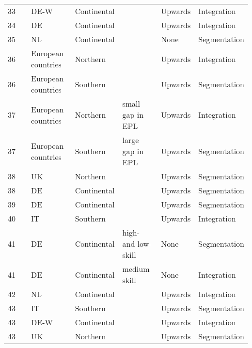 \begin{longtable}{l>{\raggedright\arraybackslash}p{1.2in}>{\raggedright\arraybackslash}p{.9in}>{\raggedright\arraybackslash}p{.9in}>{\raggedright\arraybackslash}p{1.2in}ll}
   33 & \citealp{mcginnity_etal_2005} & DE-W & Continental &  & Upwards & Integration \\ 
   34 & \citealp{mertens_mcginnity_2002} & DE & Continental &  & Upwards & Integration \\ 
   35 & \citealp{mooi-reci_dekker_2015} & NL & Continental &  & None & Segmentation \\ 
   36 & \citealp{muffels_luijkx_2008} & 14 European countries & Northern &  & Upwards & Integration \\ 
   36 & \citealp{muffels_luijkx_2008} & 14 European countries & Southern &  & Upwards & Segmentation \\ 
   37 & \citealp{passaretta_wolbers_2019} & 17 European countries & Northern & small gap in EPL & Upwards & Integration \\ 
   37 & \citealp{passaretta_wolbers_2019} & 17 European countries & Southern & large gap in EPL & Upwards & Segmentation \\ 
   38 & \citealp{pavlopoulos_2013} & UK & Northern &  & Upwards & Segmentation \\ 
   38 & \citealp{pavlopoulos_2013} & DE & Continental &  & Upwards & Segmentation \\ 
   39 & \citealp{pfeifer_2012} & DE & Continental &  & Upwards & Segmentation \\ 
   40 & \citealp{picchio_2008} & IT & Southern &  & Upwards & Integration \\ 
   41 & \citealp{reichelt_2015} & DE & Continental & high- and low-skill & None & Segmentation \\ 
   41 & \citealp{reichelt_2015} & DE & Continental & medium skill & None & Integration \\ 
   42 & \citealp{remery_etal_2002} & NL & Continental &  & Upwards & Integration \\ 
   43 & \citealp{scherer_2004} & IT & Southern &  & Upwards & Segmentation \\ 
   43 & \citealp{scherer_2004} & DE-W & Continental &  & Upwards & Integration \\ 
   43 & \citealp{scherer_2004} & UK & Northern &  & Upwards & Segmentation \\ 
  \hline
\end{longtable}
